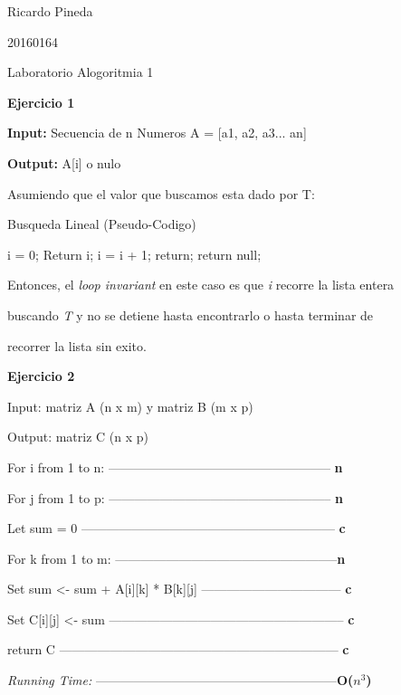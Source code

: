 \documentclass[11pt]{article}
\begin{document}
\begin{flushleft}
Ricardo Pineda

20160164
\end{flushleft}

\begin{center}
Laboratorio Alogoritmia 1
\end{center}
\textbf{Ejercicio 1} 

\textbf{Input:}
Secuencia de n Numeros A = [a1, a2, a3... an]

\textbf{Output:}
A[i] o nulo

Asumiendo que el valor que buscamos esta dado por T:

\begin{frame}

    \begin{algorithm}[H]
        \caption{Busqueda Lineal (Pseudo-Codigo)}
        \begin{algorithmic}[1]
        \State i = 0;
        \State Return i;
        \Else
        \State i = i + 1;
        \State return; 
        \EndIf
        \EndFor
        \State return null;
        \EndIf
        \end{algorithmic}
    \end{algorithm}
\end{frame}
Entonces, el \textit{loop invariant} en este caso es que \textit{i} recorre la lista entera

buscando \textit{T} y no se detiene hasta encontrarlo o hasta terminar de 

recorrer la lista sin exito.

\begin{flushleft}
\end{flushleft}

\begin{flushleft}
\textbf{Ejercicio 2} 
\end{flushleft}

Input: matriz A (n x m) y matriz B (m x p)

Output: matriz C (n x p)
\begin{flushleft}
For i from 1 to n: ----------------------------------------------------- \textbf{n}

	For j from 1 to p: ----------------------------------------------------- \textbf{n}
	
		{Let sum = 0} ------------------------------------------------------------\textbf{ c}
		
		For k from 1 to m: -----------------------------------------------------\textbf{n}
		
			Set sum <- sum + A[i][k] * B[k][j] --------------------------------- \textbf{c}
			
		Set C[i][j] <- sum -------------------------------------------------------- \textbf{c}
		
return C ------------------------------------------------------------------ \textbf{c}

\textit{Running Time:} ---------------------------------------------------------\textbf{O($n^3$)}
\end{flushleft}
\end{document}
